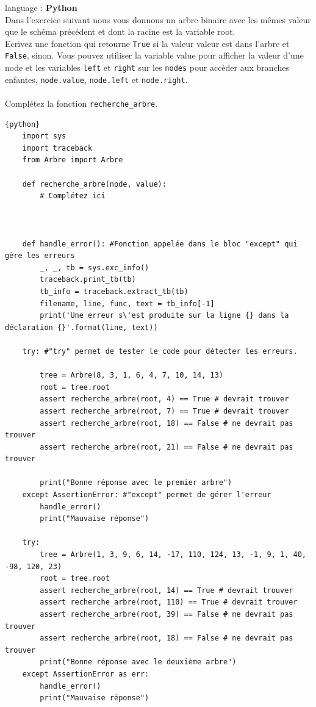 \begin{Exercice}[15 minutes] language : \textbf{Python}\\
    
    Dans l'exercice suivant nous vous donnons un arbre binaire avec les mêmes valeur que le schéma précédent et dont la racine est la variable root.\\

    Ecrivez une fonction qui retourne \lstinline{True} si la valeur valeur est dans l'arbre et \lstinline{False}, sinon. Vous pouvez utiliser la variable value pour afficher la valeur d'une node et les variables \lstinline{left} et \lstinline{right} sur les \lstinline{nodes} pour accèder aux branches enfantes, \lstinline{node.value}, \lstinline{node.left} et \lstinline{node.right}.\\\\
    Complétez la fonction \lstinline{recherche_arbre}.\\
    \begin{lstlisting}{python}
    import sys
    import traceback
    from Arbre import Arbre
    
    def recherche_arbre(node, value):
        # Complétez ici
        
    
    
    def handle_error(): #Fonction appelée dans le bloc "except" qui gère les erreurs
        _, _, tb = sys.exc_info()
        traceback.print_tb(tb) 
        tb_info = traceback.extract_tb(tb)
        filename, line, func, text = tb_info[-1]
        print('Une erreur s\'est produite sur la ligne {} dans la déclaration {}'.format(line, text))
    
    try: #"try" permet de tester le code pour détecter les erreurs.
    
        tree = Arbre(8, 3, 1, 6, 4, 7, 10, 14, 13)
        root = tree.root
        assert recherche_arbre(root, 4) == True # devrait trouver
        assert recherche_arbre(root, 7) == True # devrait trouver
        assert recherche_arbre(root, 18) == False # ne devrait pas trouver
        assert recherche_arbre(root, 21) == False # ne devrait pas trouver
    
        print("Bonne réponse avec le premier arbre")
    except AssertionError: #"except" permet de gérer l'erreur
        handle_error()
        print("Mauvaise réponse")
        
    try:
        tree = Arbre(1, 3, 9, 6, 14, -17, 110, 124, 13, -1, 9, 1, 40, -98, 120, 23)
        root = tree.root
        assert recherche_arbre(root, 14) == True # devrait trouver
        assert recherche_arbre(root, 110) == True # devrait trouver
        assert recherche_arbre(root, 39) == False # ne devrait pas trouver
        assert recherche_arbre(root, 18) == False # ne devrait pas trouver
        print("Bonne réponse avec le deuxième arbre")
    except AssertionError as err:
        handle_error()
        print("Mauvaise réponse")


\end{lstlisting}
\end{Exercice}
